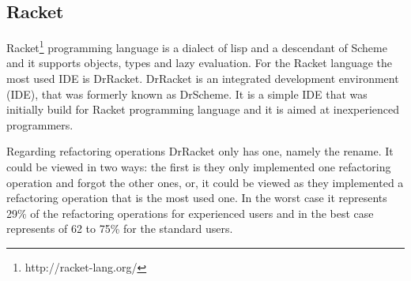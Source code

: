 \subsection{Racket}

Racket\footnote{http://racket-lang.org/} programming language is a dialect of lisp and a descendant of Scheme and it supports objects, types and lazy evaluation.
For the Racket language the most used IDE is DrRacket. 
DrRacket is an integrated development environment (IDE), that was formerly known as DrScheme. 
It is a simple IDE that was initially build for Racket programming language and it is aimed at inexperienced programmers.

Regarding refactoring operations DrRacket only has one, namely the rename. 
It could be viewed in two ways: the first is they only implemented one refactoring operation and forgot the other ones, or, it could be viewed as they implemented a refactoring operation that is the most used one. In the worst case it represents 29\% of the refactoring operations for experienced users and in the best case represents of 62 to 75\% for the standard users. 